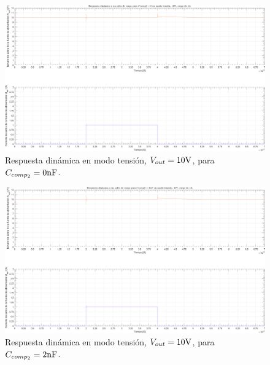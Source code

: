 \clearpage

\begin{figure}[H] %
\begin{center}
\includegraphics[width=1.1 \textwidth, angle=90]{./img/plots/dynamic/power_supply_CCOMP2_0_STEP_Modo1.png}
\caption{\label{fig:fig_power_supply_CCOMP2_STEP_0_Modo1}\footnotesize{Respuesta dinámica en modo tensión, $V_{out} = 10 \si[per-mode=symbol]{\volt}$, para $C_{comp_{2}} = 0 \si[per-mode=symbol]{\nano\farad} $.}}
\end{center}
\end{figure}

\clearpage

\begin{figure}[H] %
\begin{center}
\includegraphics[width=1.1 \textwidth, angle=90]{./img/plots/dynamic/power_supply_CCOMP2_2n_STEP_Modo1.png}
\caption{\label{fig:fig_power_supply_CCOMP2_STEP_2n_Modo1}\footnotesize{Respuesta dinámica en modo tensión, $V_{out} = 10 \si[per-mode=symbol]{\volt}$, para $C_{comp_{2}} = 2 \si[per-mode=symbol]{\nano\farad} $.}}
\end{center}
\end{figure}

